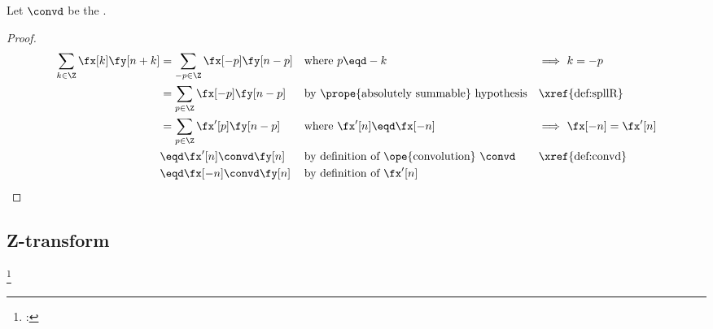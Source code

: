 \begin{proposition}
\label{prop:conv_knk}
Let $\convd$ be the  .
\end{proposition}
\begin{proof}
\begin{align*}
  \sum_{k\in\Z} \fx[k]\fy[n+k] 
    &= \sum_{-p\in\Z} \fx[-p]\fy[n-p] 
    && \text{where $p\eqd -k$}
    && \text{$\implies$ $k=-p$}
  \\&= \sum_{p\in\Z} \fx[-p]\fy[n-p] 
    && \text{by \prope{absolutely summable} hypothesis}
    && \text{\xref{def:spllR}}
  \\&= \sum_{p\in\Z} \fx'[p]\fy[n-p] 
    && \text{where $\fx'[n] \eqd\fx[-n]$}
    && \text{$\implies$ $\fx[-n]=\fx'[n]$}
  \\&\eqd \fx'[n]\convd\fy[n]
    && \text{by definition of \ope{convolution} $\convd$}
    && \text{\xref{def:convd}}
  \\&\eqd \fx[-n]\convd\fy[n]
    && \text{by definition of $\fx'[n]$}
\end{align*}
\end{proof}

\subsection{Z-transform}
\begin{definition}
\footnote{
  : 
  }
\label{def:opZ}
\end{definition}


